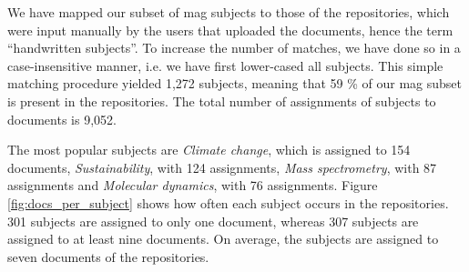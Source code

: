 We have mapped our subset of \acrshort{mag} subjects to those of the repositories, which were input manually by the users that uploaded the documents, hence the term ``handwritten subjects''. To increase the number of matches, we have done so in a case-insensitive manner, i.e. we have first lower-cased all subjects. This simple matching procedure yielded 1,272 subjects, meaning that 59 \% of our \acrshort{mag} subset is present in the repositories. The total number of assignments of subjects to documents is 9,052.

The most popular subjects are \textit{Climate change}, which is assigned to 154 documents, \textit{Sustainability}, with 124 assignments, \textit{Mass spectrometry}, with 87 assignments and \textit{Molecular dynamics}, with 76 assignments. Figure \ref{fig:docs_per_subject} shows how often each subject occurs in the repositories. 301 subjects are assigned to only one document, whereas 307 subjects are assigned to at least nine documents. On average, the subjects are assigned to seven documents of the repositories.

